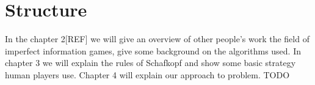 \section{Structure}
In the chapter 2[REF] we will give an overview of other people's work the field of imperfect information games, give
some background on the algorithms used.
In chapter 3 we will explain the rules of Schafkopf and show some basic strategy human players use.
Chapter 4 will explain our approach to problem. TODO